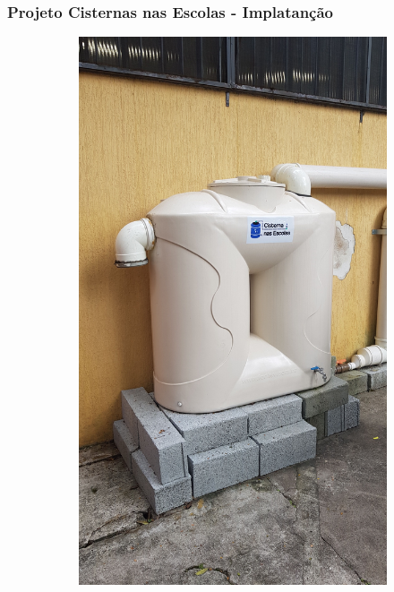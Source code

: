 \documentclass{beamer}
\begin{document}
\begin{frame}
\frametitle{Projeto Cisternas nas Escolas - Implatanção}
\begin{minipage}{\textwidth}

	\begin{figure}
		\vspace{+10pt}
		\centering
		\begin{subfigure}{0.3\textwidth}
			\includegraphics[width=\textwidth]{foto_cisterna2.jpg}

\end{subfigure}
\end{figure}
\end{minipage}
\end{frame}
\end{document}
